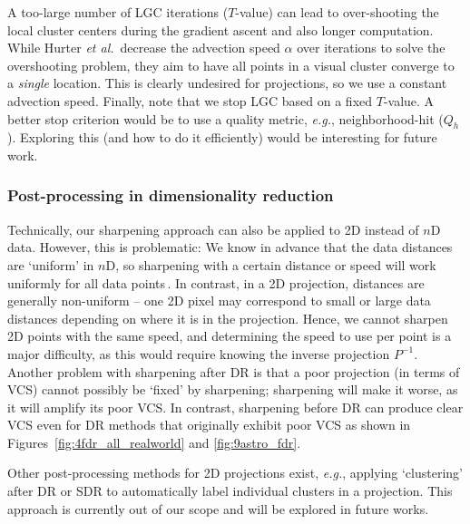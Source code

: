 \documentclass[sagev,Afour,times]{sagej}
\begin{document}
A too-large number of LGC iterations ($T$-value) can lead to over-shooting the local cluster centers during the gradient ascent and also longer computation. While Hurter \emph{et al.}\,\cite{alex1} decrease the advection speed $\alpha$ over iterations to solve the overshooting problem, they aim to have all points in a visual cluster converge to a \emph{single} location. This is clearly undesired for projections, so we use a constant advection speed. Finally, note that we stop LGC based on a fixed $T$-value. A better stop criterion would be to use a quality metric, \emph{e.g.}, neighborhood-hit ($Q_h$). Exploring this (and how to do it efficiently) would be interesting for future work.

\subsubsection{Post-processing in dimensionality reduction}
Technically, our sharpening approach can also be applied to 2D instead of $n$D data. However, this is problematic: We know in advance that the data distances are `uniform' in $n$D, so sharpening with a certain distance or speed will work uniformly for all data points\,\cite{gc1975, ms}. In contrast, in a 2D projection, distances are generally non-uniform -- one 2D pixel may correspond to small or large data distances depending on where it is in the projection. Hence, we cannot sharpen 2D points with the same speed, and determining the speed to use per point is a major difficulty, as this would require knowing the inverse projection $P^{-1}$. 
Another problem with sharpening after DR is that a poor projection (in terms of VCS) cannot possibly be `fixed' by sharpening; sharpening will make it worse, as it will amplify its poor VCS. In contrast, sharpening before DR can produce clear VCS even for DR methods that originally exhibit poor VCS as shown in Figures~\ref{fig:4fdr_all_realworld} and \ref{fig:9astro_fdr}.

Other post-processing methods for 2D projections exist, \emph{e.g.}, applying `clustering' after DR or SDR to automatically label individual clusters in a projection. This approach is currently out of our scope and will be explored in future works.
\end{document}

